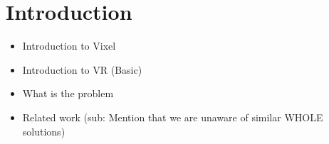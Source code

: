 \section{Introduction}
\begin{itemize}
    \item Introduction to Vixel
    \item Introduction to VR (Basic)
    \item What is the problem
    \item Related work (sub: Mention that we are unaware of similar WHOLE solutions)
\end{itemize}